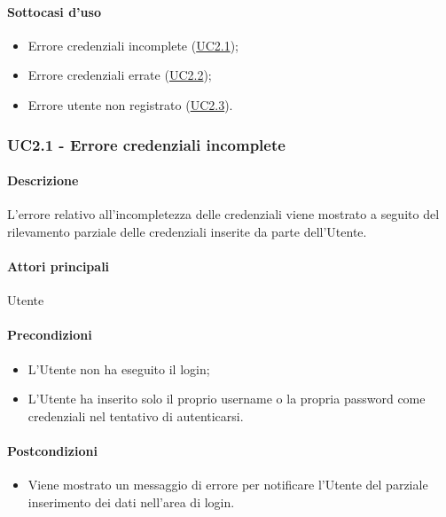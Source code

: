 \paragraph*{Sottocasi d'uso}
\begin{itemize}
  \item Errore credenziali incomplete (\hyperref[UC2point1]{UC2.1});
  \item Errore credenziali errate (\hyperref[UC2point2]{UC2.2});
  \item Errore utente non registrato (\hyperref[UC2point3]{UC2.3}).
\end{itemize}


\subsubsection{UC2.1 - Errore credenziali incomplete}\label{UC2point1}
\paragraph*{Descrizione}
L’errore relativo all’incompletezza delle credenziali viene mostrato a seguito del rilevamento parziale delle credenziali inserite da parte dell’Utente.

\paragraph*{Attori principali}
Utente

\paragraph*{Precondizioni}
\begin{itemize}
  \item L’Utente non ha eseguito il login;
  \item L’Utente ha inserito solo il proprio username o la propria password come credenziali nel tentativo di autenticarsi.  
\end{itemize}

\paragraph*{Postcondizioni}
\begin{itemize}
  \item Viene mostrato un messaggio di errore per notificare l’Utente del parziale inserimento dei dati nell’area di login.
\end{itemize}


